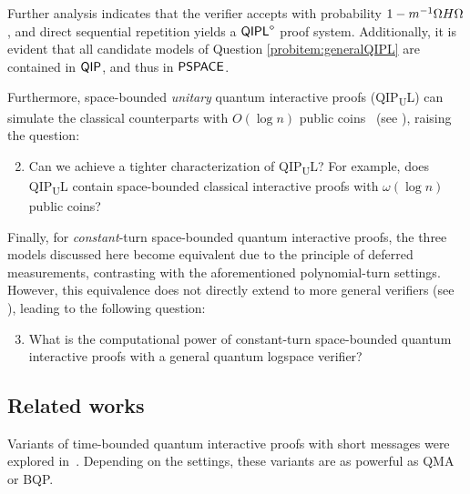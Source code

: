 \documentclass[10pt,a4paper]{article}
\numberwithin{equation}{section}
\numberwithin{figure}{section}
\newcommand{\BQP}{\textnormal{\textsf{BQP}}\xspace}
\newcommand{\QMA}{\textnormal{\textsf{QMA}}\xspace}
\newcommand{\QIP}{\textnormal{\textsf{QIP}}\xspace}
\newcommand{\QIPL}{\textnormal{\textsf{QIPL}}\xspace}
\newcommand{\QIPUL}{\texorpdfstring{\textnormal{\textsf{QIP}\textsubscript{\textnormal{U}}\textsf{L}}}\xspace}
\newcommand{\PSPACE}{\textnormal{\textsf{PSPACE}}\xspace}
\let\ket\relax\DeclarePairedDelimiter\ket{\lvert}{\rangle}
\let\bra\relax\DeclarePairedDelimiter\bra{\langle}{\rvert}
\begin{document}
Further analysis indicates that the verifier accepts with probability $1-m^{-1} \bra{\Omega} H \ket{\Omega}$, and direct sequential repetition yields a $\QIPL^{\diamond}$ proof system. 
Additionally, it is evident that all candidate models of Question \ref{probitem:generalQIPL} are contained in $\QIP$, and thus in $\PSPACE$.

\vspace{0.5em}
Furthermore, space-bounded \textit{unitary} quantum interactive proofs (\QIPUL{}) can simulate the classical counterparts with $O(\log{n})$ public coins~\cite{Fortnow89} (see ), raising the question: 
\begin{enumerate}[label={\upshape(\alph*)},itemsep=0.3em,topsep=0.3em,parsep=0.3em]
    \setcounter{enumi}{1}
    \item Can we achieve a tighter characterization of \QIPUL{}? For example, does \QIPUL{} contain space-bounded classical interactive proofs with $\omega(\log{n})$ public coins? \label{probitem:QIPUL}
\end{enumerate}

\vspace{0.5em}
Finally, for \textit{constant}-turn space-bounded quantum interactive proofs, the three models discussed here become equivalent due to the principle of deferred measurements, contrasting with the aforementioned polynomial-turn settings. However, this equivalence does not directly extend to more general verifiers (see ), leading to the following question: 

\begin{enumerate}[label={\upshape(\alph*)},itemsep=0.3em,topsep=0.3em,parsep=0.3em]
    \setcounter{enumi}{2}
    \item What is the computational power of constant-turn space-bounded quantum interactive proofs with a general quantum logspace verifier?  \label{probitem:constTurnQIPL}
\end{enumerate}

\subsection{Related works}
Variants of time-bounded quantum interactive proofs with short messages were explored in~\cite{BSW11,Pereszlenyi12}. Depending on the settings, these variants are as powerful as \QMA{} or \BQP{}. 
\end{document}
